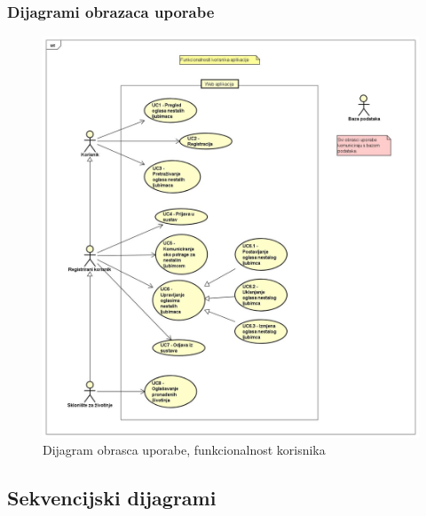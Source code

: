 \pagebreak
\subsubsection{Dijagrami obrazaca uporabe}

\begin{figure}[htb]
	\centering
	\includegraphics[width=\textwidth]{slike/funkcionalnost_korisnika.jpg}
	\caption{Dijagram obrasca uporabe, funkcionalnost korisnika}
\end{figure}

\pagebreak
\subsection{Sekvencijski dijagrami}

